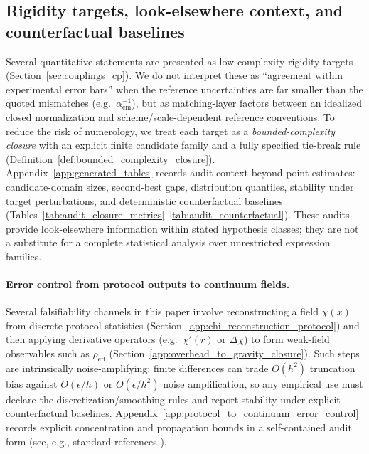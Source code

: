 \subsection{Rigidity targets, look-elsewhere context, and counterfactual baselines}
Several quantitative statements are presented as low-complexity rigidity targets (Section~\ref{sec:couplings_cp}).
We do not interpret these as ``agreement within experimental error bars'' when the reference uncertainties are far smaller than the quoted mismatches (e.g.\ $\alpha_{\mathrm{em}}^{-1}$), but as matching-layer factors between an idealized closed normalization and scheme/scale-dependent reference conventions.
To reduce the risk of numerology, we treat each target as a \emph{bounded-complexity closure} with an explicit finite candidate family and a fully specified tie-break rule (Definition~\ref{def:bounded_complexity_closure}).
Appendix~\ref{app:generated_tables} records audit context beyond point estimates:
candidate-domain sizes, second-best gaps, distribution quantiles, stability under target perturbations, and deterministic counterfactual baselines (Tables~\ref{tab:audit_closure_metrics}--\ref{tab:audit_counterfactual}).
These audits provide look-elsewhere information within stated hypothesis classes; they are not a substitute for a complete statistical analysis over unrestricted expression families.

\paragraph{Error control from protocol outputs to continuum fields.}
Several falsifiability channels in this paper involve reconstructing a field $\chi(x)$ from discrete protocol statistics (Section~\ref{app:chi_reconstruction_protocol}) and then applying derivative operators (e.g.\ $\chi'(r)$ or $\Delta\chi$) to form weak-field observables such as $\rho_{\mathrm{eff}}$ (Section~\ref{app:overhead_to_gravity_closure}).
Such steps are intrinsically noise-amplifying: finite differences can trade $O(h^2)$ truncation bias against $O(\epsilon/h)$ or $O(\epsilon/h^2)$ noise amplification, so any empirical use must declare the discretization/smoothing rules and report stability under explicit counterfactual baselines.
Appendix~\ref{app:protocol_to_continuum_error_control} records explicit concentration and propagation bounds in a self-contained audit form (see, e.g., standard references \cite{LeVeque2007FDM,BoucheronLugosiMassart2013,vanDerVaart1998}).

